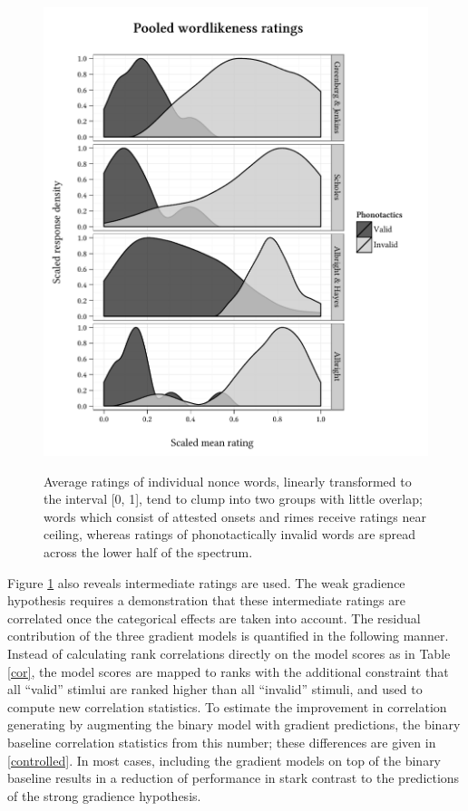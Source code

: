 \begin{figure} \centering \label{density}
\includegraphics{density.pdf}
\caption{Average ratings of individual nonce words, linearly transformed to the interval [0, 1], tend to clump into two groups with little overlap; words which consist of  attested onsets and rimes receive ratings near ceiling, whereas ratings of phonotactically invalid words are spread across the lower half of the spectrum.}
\end{figure}

Figure \ref{density} also reveals intermediate ratings are used. The weak gradience hypothesis requires a demonstration that these intermediate ratings are correlated once the categorical effects are taken into account. The residual contribution of the three gradient models is quantified in the following manner. Instead of calculating rank correlations directly on the model scores as in Table \ref{cor}, the model scores are mapped to ranks with the additional constraint that all ``valid'' stimlui are ranked higher than all ``invalid'' stimuli, and used to compute new correlation statistics. To estimate the improvement in correlation generating by augmenting the binary model with gradient predictions, the binary baseline correlation statistics from this number; these differences are given in \ref{controlled}.  In most cases, including the gradient models on top of the binary baseline results in a reduction of performance in stark contrast to the predictions of the strong gradience hypothesis.

